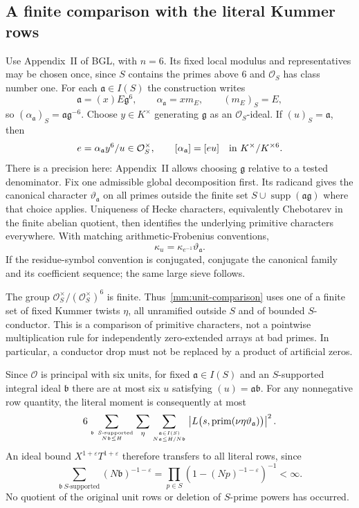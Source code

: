 \documentclass[11pt]{article}
\theoremstyle{definition}\newtheorem{definition}[theorem]{Definition}
\theoremstyle{remark}\newtheorem{remark}[theorem]{Remark}
\begin{document}
\subsection{A finite comparison with the literal Kummer rows}
Use Appendix~II of BGL, with $n=6$. Its fixed local modulus and
representatives may be chosen once, since $S$ contains the primes above
$6$ and $\mathcal O_S$ has class number one. For each
$\mathfrak a\in I(S)$ the construction writes
\[
 \mathfrak a=(x)E\mathfrak g^6,\qquad
 \alpha_{\mathfrak a}=xm_E,\qquad
 (m_E)_S=E,
\]
so $(\alpha_{\mathfrak a})_S=\mathfrak a\mathfrak g^{-6}$.
Choose $y\in K^\times$ generating $\mathfrak g$ as an
$\mathcal O_S$-ideal. If $(u)_S=\mathfrak a$, then
\[
 e=\alpha_{\mathfrak a}y^6/u\in\mathcal O_S^\times,\qquad
 [\alpha_{\mathfrak a}]=[eu]\quad\hbox{in }K^\times/K^{\times6}.
\]
There is a precision here: Appendix~II allows choosing $\mathfrak g$
relative to a tested denominator. Fix one admissible global decomposition
first. Its radicand gives the canonical character
$\vartheta_{\mathfrak a}$ on all primes outside the finite set
$S\cup\operatorname{supp}(\mathfrak a\mathfrak g)$ where that
choice applies. Uniqueness of Hecke characters, equivalently Chebotarev
in the finite abelian quotient, then identifies the underlying primitive
characters everywhere. With matching arithmetic-Frobenius conventions,
\begin{equation}\label{mm:unit-comparison}
 \kappa_u=\kappa_{e^{-1}}\vartheta_{\mathfrak a}.
\end{equation}
If the residue-symbol convention is conjugated, conjugate the canonical
family and its coefficient sequence; the same large sieve follows.

The group $\mathcal O_S^\times/(\mathcal O_S^\times)^6$ is finite.
Thus~\eqref{mm:unit-comparison} uses one of a finite set of fixed
Kummer twists $\eta$, all unramified outside $S$ and of bounded
$S$-conductor. This is a comparison of primitive characters, not a
pointwise multiplication rule for independently zero-extended arrays at
bad primes. In particular, a conductor drop must not be replaced by a
product of artificial zeros.

Since $\mathcal O$ is principal with six units, for fixed
$\mathfrak a\in I(S)$ and an $S$-supported integral ideal
$\mathfrak b$ there are at most six $u$ satisfying
$(u)=\mathfrak a\mathfrak b$. For any nonnegative row quantity, the
literal moment is consequently at most
\begin{equation}\label{mm:literal-sum}
 6\sum_{\mathfrak b\ S\text{-supported}\atop N\mathfrak b\le H}
   \sum_{\eta}\sum_{\mathfrak a\in I(S)\atop N\mathfrak a\le H/N\mathfrak b}
 \left|L\bigl(s,\operatorname{prim}(\nu\eta
                       \vartheta_{\mathfrak a})\bigr)\right|^2.
\end{equation}
An ideal bound $X^{1+\varepsilon}T^{1+\varepsilon}$ therefore transfers
to all literal rows, since
\[
 \sum_{\mathfrak b\ S\text{-supported}}(N\mathfrak b)^{-1-\varepsilon}
 =\prod_{p\in S}(1-(Np)^{-1-\varepsilon})^{-1}<\infty.
\]
No quotient of the original unit rows or deletion of $S$-prime powers
has occurred.
\end{document}
